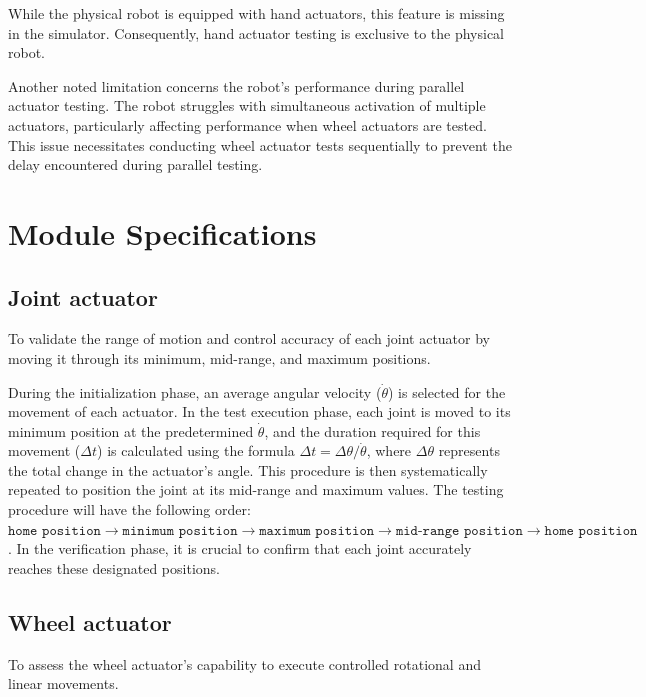 \documentclass{CSSRforAfrica}
\begin{document}
While the physical robot is equipped with hand actuators, this feature is missing in the simulator. Consequently, hand 
actuator testing is exclusive to the physical robot.

Another noted limitation concerns the robot's performance during parallel actuator testing. The robot struggles with 
simultaneous activation of multiple actuators, particularly affecting performance when wheel actuators are tested. 
This issue necessitates conducting wheel actuator tests sequentially to prevent the delay encountered during parallel 
testing.

\newpage

\section{Module Specifications}

\subsection*{Joint actuator}
To validate the range of motion and control accuracy of each joint actuator by moving it through its minimum, mid-range, 
and maximum positions.

During the initialization phase, an average angular velocity ($\dot{\theta}$) is selected for the movement of each actuator. 
In the test execution phase, each joint is moved to its minimum position at the predetermined $\dot{\theta}$, and the 
duration required for this movement ($\Delta t$) is calculated using the formula $\Delta t = \Delta \theta / \dot{\theta}$, 
where $\Delta \theta$ represents the total change in the actuator's angle. This procedure is then systematically repeated 
to position the joint at its mid-range and maximum values. The testing procedure will have the following order:
$\texttt{home position} \rightarrow \texttt{minimum position} \rightarrow \texttt{maximum position} \rightarrow \texttt{mid-range 
position} \rightarrow \texttt{home position}$. In the verification phase, it is crucial to confirm that each 
joint accurately reaches these designated positions.

\subsection*{Wheel actuator}
To assess the wheel actuator's capability to execute controlled rotational and linear movements.
\end{document}
